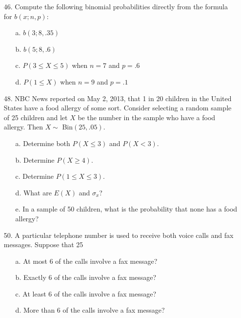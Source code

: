 \documentclass[letterpaper,12pt]{article}
\begin{document}
\maketitle

\begin{enumerate}
  \item[46.]
    Compute the following binomial probabilities directly from the formula for $b(x; n, p)$:
    \begin{enumerate}
      \item[a.]
        $b(3; 8, .35)$
      \item[b.]
        $b(5; 8, .6)$
      \item[c.]
        $P(3 \le X \le 5)$ when $n = 7$ and $p = .6$
      \item[d.]
        $P(1 \le X)$ when $n = 9$ and $p = .1$
    \end{enumerate}
  \item[48.]
    NBC News reported on May 2, 2013, that 1 in 20 children in the United States have a food allergy of some sort. Consider selecting a random sample of 25 children and let $X$ be the number in the sample who have a food allergy. Then $X \sim$ Bin$(25, .05)$.
    \begin{enumerate}
      \item[a.]
        Determine both $P(X \le 3)$ and $P(X < 3)$.
      \item[b.]
        Determine $P(X \ge 4)$.
      \item[c.]
        Determine $P(1 \le X \le 3)$.
      \item[d.]
        What are $E(X)$ and $\sigma_x$?
      \item[e.]
        In a sample of 50 children, what is the probability that none has a food allergy?
    \end{enumerate}
  \item[50.]
    A particular telephone number is used to receive both voice calls and fax messages. Suppose that 25%
    \begin{enumerate}
      \item[a.]
        At most 6 of the calls involve a fax message?
      \item[b.]
        Exactly 6 of the calls involve a fax message?
      \item[c.]
        At least 6 of the calls involve a fax message?
      \item[d.]
        More than 6 of the calls involve a fax message?

\end{enumerate}
\end{enumerate}
\end{document}
